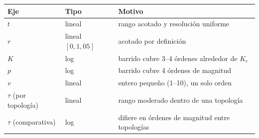 \documentclass[11pt,a4paper]{article}
\begin{document}
\begin{table}[H]
  \centering
  \begin{tabular}{lll}
    \toprule
    \textbf{Eje} & \textbf{Tipo} & \textbf{Motivo} \\
    \midrule
    $t$                    & lineal              & rango acotado y resolución uniforme \\
    $r$                    & lineal $[0, 1{,}05]$ & acotado por definición \\
    $K$                    & log                 & barrido cubre 3--4 órdenes alrededor de $K_c$ \\
    $p$                    & log                 & barrido cubre 4 órdenes de magnitud \\
    $v$                    & lineal              & entero pequeño (1--10), un solo orden \\
    $\tau$ (por topología) & lineal              & rango moderado dentro de una topología \\
    $\tau$ (comparativa)   & log                 & difiere en órdenes de magnitud entre topologías \\
    \bottomrule
  \end{tabular}
\end{table}
\end{document}

